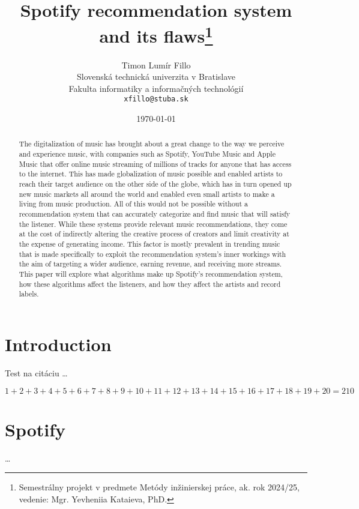\documentclass[10pt,twoside,slovak,a4paper]{article}
\title{Spotify recommendation system and its flaws\thanks{Semestrálny projekt v predmete Metódy inžinierskej práce, ak. rok 2024/25, vedenie: Mgr. Yevheniia Kataieva, PhD.}} %
\author{Timon Lumír Fillo\\[2pt]
	{\small Slovenská technická univerzita v Bratislave}\\
	{\small Fakulta informatiky a informačných technológií}\\
	{\small \texttt{xfillo@stuba.sk}}
	}
\date{\small \today} %
\begin{document}
\maketitle

\begin{abstract}

The digitalization of music has brought about a great change to the way we perceive and experience music, with companies such as Spotify, YouTube Music and Apple Music that offer online music streaming of millions of tracks for anyone that has access to the internet. This has made globalization of music possible and enabled artists to reach their target audience on the other side of the globe, which has in turn opened up new music markets all around the world and enabled even small artists to make a living from music production. All of this would not be possible without a recommendation system that can accurately categorize and find music that will satisfy the listener. While these systems provide relevant music recommendations, they come at the cost of indirectly altering the creative process of creators and limit creativity at the expense of generating income. This factor is mostly prevalent in trending music that is made specifically to exploit the recommendation system's inner workings with the aim of targeting a wider audience, earning revenue, and receiving more streams. This paper will explore what algorithms make up Spotify's recommendation system, how these algorithms affect the listeners, and how they affect the artists and record labels.

\end{abstract}



\section{Introduction}
Test na citáciu
\cite{hodgson2021spotify}
\dots

\begin{equation}
	1+2+3+4+5+6+7+8+9+10+11+12+13+14+15+16+17+18+19+20=210
\end{equation}
\section{Spotify}\label{spotify}
\dots
\end{document}
